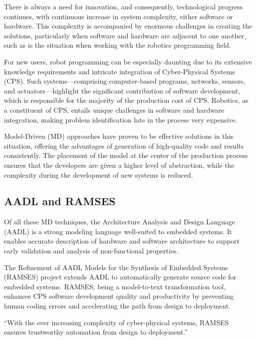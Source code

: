 There is always a need for innovation, and consequently, technological progress continues, with continuous increase in system complexity, either software or hardware. This complexity is accompanied by enormous challenges in creating the solutions, particularly when software and hardware are adjacent to one another, such as is the situation when working with the robotics programming field. 
\par
For new users, robot programming can be especially daunting due to its extensive knowledge requirements and intricate integration of Cyber-Physical Systems (CPS). Such systems—comprising computer-based programs, networks, sensors, and actuators—highlight the significant contribution of software development, which is responsible for the majority of the production cost of CPS. Robotics, as a constituent of CPS, entails unique challenges in software and hardware integration, making problem identification late in the process very expensive.
\par
Model-Driven (MD) approaches have proven to be effective solutions in this situation, offering the advantages of generation of high-quality code and results consistently. The placement of the model at the center of the production process ensures that the developers are given a higher level of abstraction, while the complexity during the development of new systems is reduced.

\subsection{AADL and RAMSES}

Of all these MD techniques, the Architecture Analysis and Design Language (AADL) is a strong modeling language well-suited to embedded systems. It enables accurate description of hardware and software architecture to support early validation and analysis of non-functional properties.
\par
The Refinement of AADL Models for the Synthesis of Embedded Systems (RAMSES) project extends AADL to automatically generate source code for embedded systems. RAMSES, being a model-to-text transformation tool, enhances CPS software development quality and productivity by preventing human coding errors and accelerating the path from design to deployment.

\begin{tcolorbox}[colback=green!8]
	“With the ever increasing complexity of cyber-physical systems, RAMSES ensures trustworthy automation from design to deployment.”
\end{tcolorbox}

